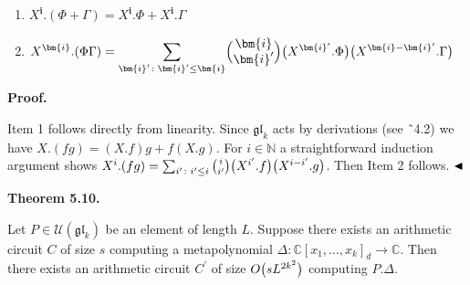 \begin{enumerate}


\item 
 


$X^{\bm{i}}.(\Phi+\Gamma)=X^{\bm{i}}.\Phi+X^{\bm{i}}.\Gamma$





\item 
 


$\displaystyle X^{\bm{i}}.(\Phi\Gamma)=\sum_{{\bm{i}}^{\prime}\colon{\bm{i}}^{\prime}\leq{\bm{i}}}\Bigl{(}\begin{array}[]{@{}c@{}}{\bm{i}}\\ {\bm{i}}^{\prime}\end{array}\Bigr{)}\big{(}X^{{\bm{i}}^{\prime}}.\Phi\big{)}\big{(}X^{{\bm{i}}-{\bm{i}}^{\prime}}.\Gamma\big{)}$





\end{enumerate}





\par\medskip\noindent\textbf{Proof.}\par




Item 1 follows directly from linearity.
Since $\mathfrak{gl}_{k}$ acts by derivations (see ˜4.2) we have $X.(fg)=(X.f)g+f(X.g)$.
For $i\in\mathbb{N}$ a straightforward induction argument shows $X^{i}.(fg)=\sum_{i^{\prime}\colon i^{\prime}\leq i}\binom{i}{i^{\prime}}\big{(}X^{i^{\prime}}.f\big{)}\big{(}X^{i-i^{\prime}}.g\big{)}$. Then Item 2 follows.
$\hfill\blacktriangleleft$





\par\medskip\noindent\textbf{Theorem 5.10.}\par



Let $P\in\mathcal{U}(\mathfrak{gl}_{k})$ be an element of length $L$.
Suppose there exists an arithmetic circuit $C$ of size $s$ computing a metapolynomial
$\Delta\colon\mathbb{C}[x_{1},\ldots,x_{k}]_{d}\to\mathbb{C}$.
Then there exists an arithmetic circuit $C^{\prime}$ of size $O\big{(}sL^{2k^{2}}\big{)}$ computing $P.\Delta$.







